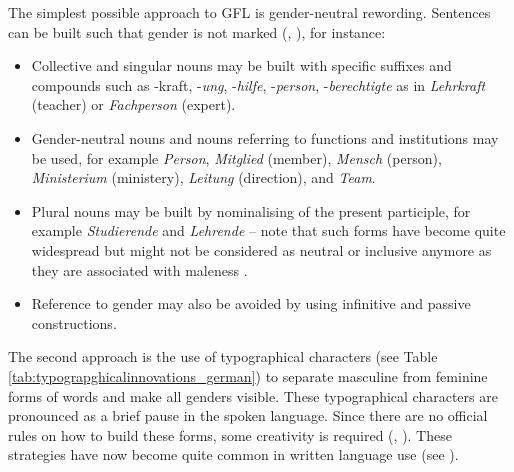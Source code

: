 The simplest possible approach to GFL is gender-neutral rewording. Sentences can be built such that gender is not marked (\cite[6]{unileipzig2020}, \cite[26]{boka2021richtlinie}), for instance:
\begin{itemize}
\setlength\itemsep{-0.5em}
    \item Collective and singular nouns may be built with specific suffixes and compounds such as -kraft, -\textit{ung}, -\textit{hilfe}, -\textit{person}, -\textit{berechtigte} as in \textit{Lehrkraft} (teacher) or \textit{Fachperson} (expert).
    \item Gender-neutral nouns and nouns referring to functions and institutions may be used, for example \textit{Person}, \textit{Mitglied} (member), \textit{Mensch} (person), \textit{Ministerium} (ministery), \textit{Leitung} (direction), and \textit{Team}.
    \item Plural nouns may be built by nominalising of the present participle, for example \textit{Studierende} and \textit{Lehrende} -- note that such forms have become quite widespread but might not be considered as neutral or inclusive anymore as they are associated with maleness \citep[49]{hornscheidt2021wie}.
    \item Reference to gender may also be avoided by using infinitive and passive constructions.
\end{itemize}

The second approach is the use of typographical characters (see Table \ref{tab:typograpghicalinnovations_german}) to separate masculine from feminine forms of words and make all genders visible. These typographical characters are pronounced as a brief pause in the spoken language. Since there are no official rules on how to build these forms, some creativity is required (\cite[4]{unileipzig2020}, \cite[27]{boka2021richtlinie}). These strategies have now become quite common in written language use (see \cite{boka2021richtlinie}).

